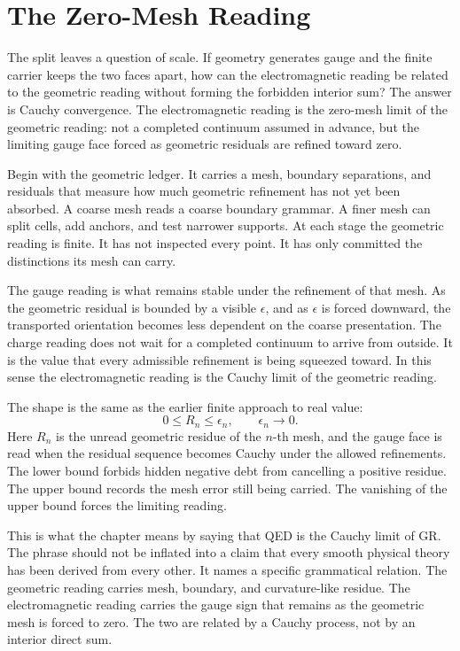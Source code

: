 \section{The Zero-Mesh Reading}

The split leaves a question of scale. If geometry generates gauge and the
finite carrier keeps the two faces apart, how can the electromagnetic
reading be related to the geometric reading without forming the forbidden
interior sum? The answer is Cauchy convergence. The electromagnetic reading
is the zero-mesh limit of the geometric reading: not a completed continuum
assumed in advance, but the limiting gauge face forced as geometric
residuals are refined toward zero.

Begin with the geometric ledger. It carries a mesh, boundary separations,
and residuals that measure how much geometric refinement has not yet been
absorbed. A coarse mesh reads a coarse boundary grammar. A finer mesh can
split cells, add anchors, and test narrower supports. At each stage the
geometric reading is finite. It has not inspected every point. It has only
committed the distinctions its mesh can carry.

The gauge reading is what remains stable under the refinement of that mesh.
As the geometric residual is bounded by a visible \(\epsilon\), and as
\(\epsilon\) is forced downward, the transported orientation becomes less
dependent on the coarse presentation. The charge reading does not wait for a
completed continuum to arrive from outside. It is the value that every
admissible refinement is being squeezed toward. In this sense the
electromagnetic reading is the Cauchy limit of the geometric reading.

The shape is the same as the earlier finite approach to real value:
\[
  0 \leq R_n \leq \epsilon_n,
  \qquad \epsilon_n \to 0 .
\]
Here \(R_n\) is the unread geometric residue of the \(n\)-th mesh, and the
gauge face is read when the residual sequence becomes Cauchy under the
allowed refinements. The lower bound forbids hidden negative debt from
cancelling a positive residue. The upper bound records the mesh error still
being carried. The vanishing of the upper bound forces the limiting reading.

This is what the chapter means by saying that QED is the Cauchy limit of GR.
The phrase should not be inflated into a claim that every smooth physical
theory has been derived from every other. It names a specific grammatical
relation. The geometric reading carries mesh, boundary, and curvature-like
residue. The electromagnetic reading carries the gauge sign that remains as
the geometric mesh is forced to zero. The two are related by a Cauchy
process, not by an interior direct sum.


